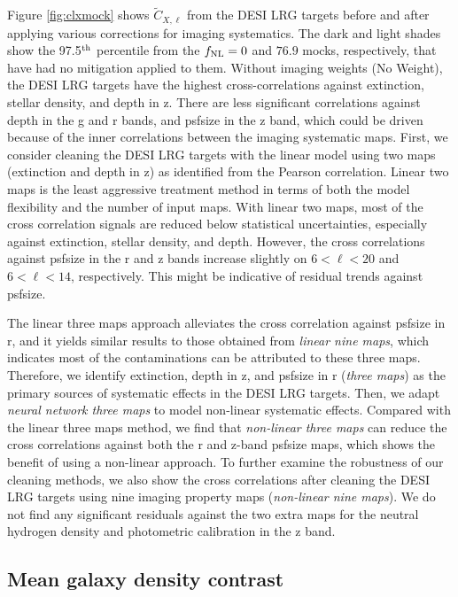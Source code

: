 Figure \ref{fig:clxmock} shows $\tilde{C}_{X,\ell}$ from the DESI LRG targets before and after applying various corrections for imaging systematics. The dark and light shades show the 97.5$^{\rm th}$ percentile from the $f_{\rm NL}=0$ and $76.9$ mocks, respectively, that have had no mitigation applied to them. Without imaging weights (No Weight), the DESI LRG targets have the highest cross-correlations against extinction, stellar density, and depth in z. There are less significant correlations against depth in the g and r bands, and psfsize in the z band, which could be driven because of the inner correlations between the imaging systematic maps. First, we consider cleaning the DESI LRG targets with the linear model using two maps (extinction and depth in z) as identified from the Pearson correlation. Linear two maps is the least aggressive treatment method in terms of both the model flexibility and the number of input maps. With linear two maps, most of the cross correlation signals are reduced below statistical uncertainties, especially against extinction, stellar density, and depth. However, the cross correlations against psfsize in the r and z bands increase slightly on $6<\ell<20$ and $6<\ell<14$, respectively. This might be indicative of residual trends against psfsize.

The linear three maps approach alleviates the cross correlation against psfsize in r, and it yields similar results to those obtained from \textit{linear nine maps}, which indicates most of the contaminations can be attributed to these three maps. Therefore, we identify extinction, depth in z, and psfsize in r (\textit{three maps}) as the primary sources of systematic effects in the DESI LRG targets. Then, we adapt \textit{neural network three maps} to model non-linear systematic effects. Compared with the linear three maps method, we find that \textit{non-linear three maps} can reduce the cross correlations against both the r and z-band psfsize maps, which shows the benefit of using a non-linear approach. To further examine the robustness of our cleaning methods, we also show the cross correlations after cleaning the DESI LRG targets using nine imaging property maps (\textit{non-linear nine maps}). We do not find any significant residuals against the two extra maps for the neutral hydrogen density and photometric calibration in the z band. 

\subsection{Mean galaxy density contrast}

